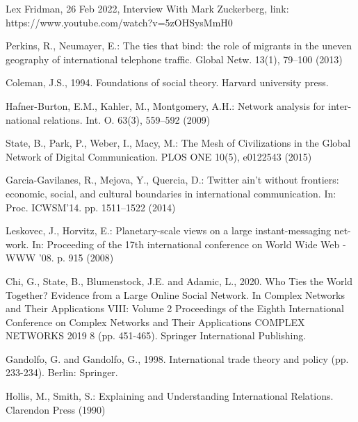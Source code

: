 \documentclass[12pt]{article}
\begin{document}
Lex Fridman, 26 Feb 2022, Interview With Mark Zuckerberg, link: https://www.youtube.com/watch?v=5zOHSysMmH0

Perkins, R., Neumayer, E.: The ties that bind: the role of migrants in the uneven
geography of international telephone traffic. Global Netw. 13(1), 79–100 (2013)

Coleman, J.S., 1994. Foundations of social theory. Harvard university press.

Hafner-Burton, E.M., Kahler, M., Montgomery, A.H.: Network analysis for inter-
national relations. Int. O. 63(3), 559–592 (2009)

State, B., Park, P., Weber, I., Macy, M.: The Mesh of Civilizations in the Global
Network of Digital Communication. PLOS ONE 10(5), e0122543 (2015)

Garcia-Gavilanes, R., Mejova, Y., Quercia, D.: Twitter ain’t without frontiers:
economic, social, and cultural boundaries in international communication. In: Proc.
ICWSM’14. pp. 1511–1522 (2014)

Leskovec, J., Horvitz, E.: Planetary-scale views on a large instant-messaging net-
work. In: Proceeding of the 17th international conference on World Wide Web -
WWW ’08. p. 915 (2008)

Chi, G., State, B., Blumenstock, J.E. and Adamic, L., 2020. Who Ties the World Together? Evidence from a Large Online Social Network. In Complex Networks and Their Applications VIII: Volume 2 Proceedings of the Eighth International Conference on Complex Networks and Their Applications COMPLEX NETWORKS 2019 8 (pp. 451-465). Springer International Publishing.

Gandolfo, G. and Gandolfo, G., 1998. International trade theory and policy (pp. 233-234). Berlin: Springer.

Hollis, M., Smith, S.: Explaining and Understanding International Relations.
Clarendon Press (1990)
\end{document}
